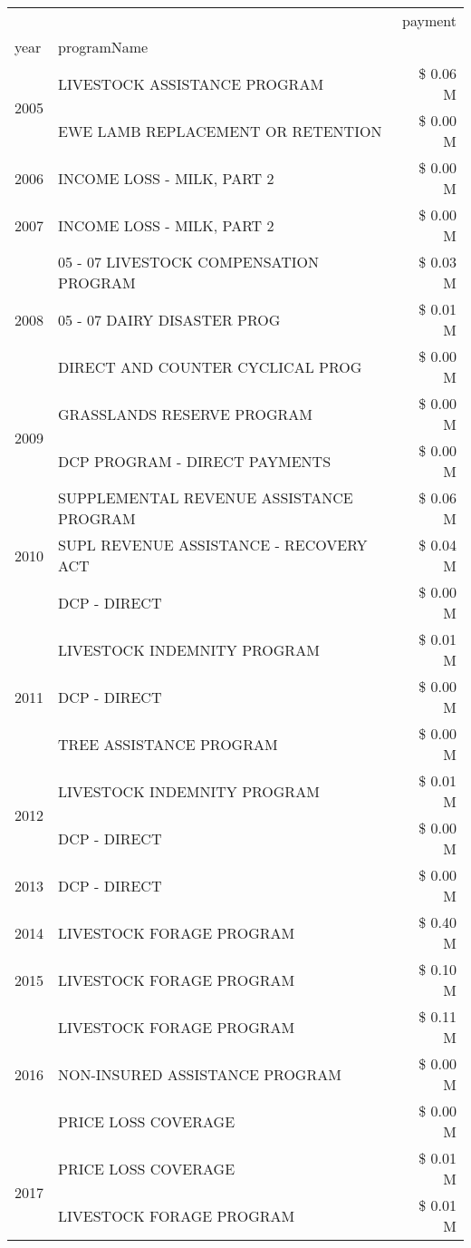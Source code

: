 \begin{tabular}{llr}
\toprule
 &  & payment \\
year & programName &  \\
\midrule
\multirow[t]{2}{*}{2005} & LIVESTOCK ASSISTANCE PROGRAM & \$ 0.06 M \\
 & EWE LAMB REPLACEMENT OR RETENTION & \$ 0.00 M \\
\cline{1-3}
2006 & INCOME LOSS - MILK, PART 2 & \$ 0.00 M \\
\cline{1-3}
2007 & INCOME LOSS - MILK, PART 2 & \$ 0.00 M \\
\cline{1-3}
\multirow[t]{3}{*}{2008} & 05 - 07 LIVESTOCK COMPENSATION PROGRAM & \$ 0.03 M \\
 & 05 - 07 DAIRY DISASTER PROG & \$ 0.01 M \\
 & DIRECT AND COUNTER CYCLICAL PROG & \$ 0.00 M \\
\cline{1-3}
\multirow[t]{2}{*}{2009} & GRASSLANDS RESERVE PROGRAM & \$ 0.00 M \\
 & DCP PROGRAM - DIRECT PAYMENTS & \$ 0.00 M \\
\cline{1-3}
\multirow[t]{3}{*}{2010} & SUPPLEMENTAL REVENUE ASSISTANCE PROGRAM & \$ 0.06 M \\
 & SUPL REVENUE ASSISTANCE - RECOVERY ACT & \$ 0.04 M \\
 & DCP - DIRECT & \$ 0.00 M \\
\cline{1-3}
\multirow[t]{3}{*}{2011} & LIVESTOCK INDEMNITY PROGRAM & \$ 0.01 M \\
 & DCP - DIRECT & \$ 0.00 M \\
 & TREE ASSISTANCE PROGRAM & \$ 0.00 M \\
\cline{1-3}
\multirow[t]{2}{*}{2012} & LIVESTOCK INDEMNITY PROGRAM & \$ 0.01 M \\
 & DCP - DIRECT & \$ 0.00 M \\
\cline{1-3}
2013 & DCP - DIRECT & \$ 0.00 M \\
\cline{1-3}
2014 & LIVESTOCK FORAGE PROGRAM & \$ 0.40 M \\
\cline{1-3}
2015 & LIVESTOCK FORAGE PROGRAM & \$ 0.10 M \\
\cline{1-3}
\multirow[t]{3}{*}{2016} & LIVESTOCK FORAGE PROGRAM & \$ 0.11 M \\
 & NON-INSURED ASSISTANCE PROGRAM & \$ 0.00 M \\
 & PRICE LOSS COVERAGE & \$ 0.00 M \\
\cline{1-3}
\multirow[t]{2}{*}{2017} & PRICE LOSS COVERAGE & \$ 0.01 M \\
 & LIVESTOCK FORAGE PROGRAM & \$ 0.01 M \\

\end{tabular}
